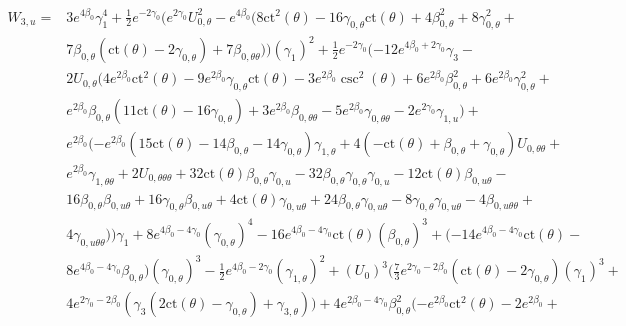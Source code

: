 \documentclass[a4paper,11pt]{article}
\numberwithin{equation}{section}
\begin{document}
\begin{align*}  \label{eq: SC2}
W_{3,u}=&3 e^{4 \beta_{0}} \gamma_{1}^4+\frac{1}{2} e^{-2 \gamma_{0}} (e^{2 \gamma_{0}} U_{0, \theta}^2-e^{4 \beta_{0}} (8 \text{ct}^2(\theta )-16 \gamma_{0, \theta} \text{ct}(\theta )+4 \beta_{0, \theta}^2+8 \gamma_{0, \theta}^2+\\
&7 \beta_{0, \theta} (\text{ct}(\theta )-2 \gamma_{0, \theta})+7 \beta_{0, \theta \theta})) (\gamma_{1})^2+\frac{1}{2} e^{-2 \gamma_{0}} (-12 e^{4 \beta_{0}+2 \gamma_{0}} \gamma_{3}-\\
&2 U_{0, \theta} (4 e^{2 \beta_{0}} \text{ct}^2(\theta )-9 e^{2 \beta_{0}} \gamma_{0, \theta} \text{ct}(\theta )-3 e^{2 \beta_{0}} \csc ^2(\theta )+6 e^{2 \beta_{0}} \beta_{0, \theta}^2+6 e^{2 \beta_{0}} \gamma_{0, \theta}^2+\\
&e^{2 \beta_{0}} \beta_{0, \theta} (11 \text{ct}(\theta )-16 \gamma_{0, \theta})+3 e^{2 \beta_{0}} \beta_{0, \theta \theta}-5 e^{2 \beta_{0}} \gamma_{0, \theta \theta}-2 e^{2 \gamma_{0}} \gamma_{1,u})+\\
&e^{2 \beta_{0}} (-e^{2 \beta_{0}} (15 \text{ct}(\theta )-14 \beta_{0, \theta}-14 \gamma_{0, \theta}) \gamma_{1, \theta}+4 (-\text{ct}(\theta )+\beta_{0, \theta}+\gamma_{0, \theta}) U_{0, \theta \theta}+\\
&e^{2 \beta_{0}} \gamma_{1, \theta \theta}+2 U_{0, \theta \theta \theta}+32 \text{ct}(\theta ) \beta_{0, \theta} \gamma_{0,u}-32 \beta_{0, \theta} \gamma_{0, \theta} \gamma_{0,u}-12 \text{ct}(\theta ) \beta_{0, u \theta}-\\
&16 \beta_{0, \theta} \beta_{0, u \theta}+16 \gamma_{0, \theta} \beta_{0, u \theta}+4 \text{ct}(\theta ) \gamma_{0, u \theta}+24 \beta_{0, \theta} \gamma_{0, u \theta}-8 \gamma_{0, \theta} \gamma_{0, u \theta}-4 \beta_{0, u \theta \theta}+\\
&4 \gamma_{0, u \theta \theta})) \gamma_{1}+8 e^{4 \beta_{0}-4 \gamma_{0}} (\gamma_{0, \theta})^4-16 e^{4 \beta_{0}-4 \gamma_{0}} \text{ct}(\theta ) (\beta_{0, \theta})^3+(-14 e^{4 \beta_{0}-4 \gamma_{0}} \text{ct}(\theta )-\\
&8 e^{4 \beta_{0}-4 \gamma_{0}} \beta_{0, \theta}) (\gamma_{0, \theta})^3-\frac{1}{2} e^{4 \beta_{0}-2 \gamma_{0}} (\gamma_{1, \theta})^2+(U_{0})^3 (\frac{7}{3} e^{2 \gamma_{0}-2 \beta_{0}} (\text{ct}(\theta )-2 \gamma_{0, \theta}) (\gamma_{1})^3+\\
&4 e^{2 \gamma_{0}-2 \beta_{0}} (\gamma_{3} (2 \text{ct}(\theta )-\gamma_{0, \theta})+\gamma_{3, \theta}))+4 e^{2 \beta_{0}-4 \gamma_{0}} \beta_{0, \theta}^2 (-e^{2 \beta_{0}} \text{ct}^2(\theta )-2 e^{2 \beta_{0}}+\\

\end{align*}
\end{document}
